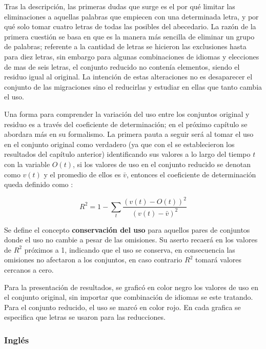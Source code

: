 Tras la descripción, las primeras dudas que surge es el por qué limitar las eliminaciones a aquellas palabras que empiecen con una determinada letra,  y por qué solo tomar cuatro letras de todas las posibles del abecedario.  La razón  de la primera cuestión  se basa en que es la manera más sencilla de eliminar un grupo de palabras; referente a la cantidad de letras se hicieron las exclusiones hasta para diez letras,  sin embargo para algunas combinaciones de idiomas y elecciones de mas de seis letras, el conjunto reducido no contenía elementos, siendo el residuo igual al original. La intención de estas alteraciones no es desaparecer el conjunto de las migraciones sino el reducirlas y estudiar en ellas que tanto cambia el uso. 

Una forma para comprender la variación del uso entre los conjuntos original y residuo es a través del coeficiente de determinación; en el próximo capítulo se abordara más en su formalismo. La primera pauta a seguir será al tomar el uso en el conjunto original como verdadero (ya que con el se establecieron los resultados del capítulo anterior) identificando sus valores a lo largo del tiempo $t$ con la variable $O(t)$, si los valores de uso en el conjunto reducido se denotan como  $v(t)$ y el promedio de ellos es $\bar{v}$, entonces   el coeficiente de determinación queda definido como :
 
\begin{equation}
 \label{ec.dif_uso}
 R^{2} = 1 - \sum_{t} \frac{ \left( v(t)- O(t) \right)^{2}  }{ \left( v(t) - \bar{v} \right)^{2} }
\end{equation}

Se define el concepto \textbf{conservación del uso} para aquellos pares de conjuntos donde el uso no cambie a pesar de las omisiones. Su aserto  recaerá en los valores de $R^{2}$ próximos a 1,  indicando que el uso se conserva, en consecuencia las omisiones no afectaron a los conjuntos, en caso contrario $R^{2}$ tomará valores cercanos a cero.

Para la presentación de resultados, se graficó en color negro los valores de uso en el conjunto original, sin importar que combinación de idiomas se este tratando.  Para el conjunto reducido, el uso se marcó en color rojo.  En cada grafica se especifica que letras se usaron para las reducciones. 

\newpage

\subsubsection*{Inglés}

